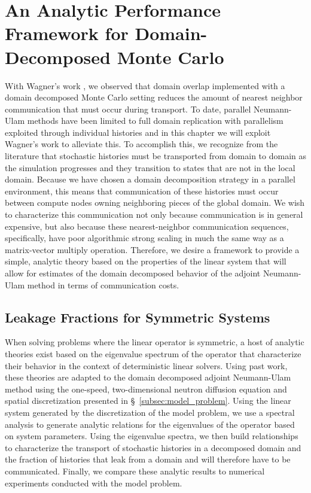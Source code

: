 \section{An Analytic Performance Framework for Domain-Decomposed Monte Carlo}
\label{sec:analytic_framework}
With Wagner's work \citep{wagner_hybrid_2010}, we observed that domain
overlap implemented with a domain decomposed Monte Carlo setting
reduces the amount of nearest neighbor communication that must occur
during transport. To date, parallel Neumann-Ulam methods have been
limited to full domain replication with parallelism exploited through
individual histories \citep{alexandrov_efficient_1998} and in this
chapter we will exploit Wagner's work to alleviate this. To accomplish
this, we recognize from the literature that stochastic histories must
be transported from domain to domain as the simulation progresses and
they transition to states that are not in the local domain. Because we
have chosen a domain decomposition strategy in a parallel environment,
this means that communication of these histories must occur between
compute nodes owning neighboring pieces of the global domain. We wish
to characterize this communication not only because communication is
in general expensive, but also because these nearest-neighbor
communication sequences, specifically, have poor algorithmic strong
scaling \citep{gropp_high-performance_2001} in much the same way as a
matrix-vector multiply operation. Therefore, we desire a framework to
provide a simple, analytic theory based on the properties of the
linear system that will allow for estimates of the domain decomposed
behavior of the adjoint Neumann-Ulam method in terms of communication
costs.

\subsection{Leakage Fractions for Symmetric Systems}
\label{sec:symmetric_leakage_fractions}
When solving problems where the linear operator is symmetric, a host
of analytic theories exist based on the eigenvalue spectrum of the
operator that characterize their behavior in the context of
deterministic linear solvers. Using past work, these theories are
adapted to the domain decomposed adjoint Neumann-Ulam method using the
one-speed, two-dimensional neutron diffusion equation and spatial
discretization presented in \S~\ref{subsec:model_problem}. Using the
linear system generated by the discretization of the model problem, we
use a spectral analysis to generate analytic relations for the
eigenvalues of the operator based on system parameters. Using the
eigenvalue spectra, we then build relationships to characterize the
transport of stochastic histories in a decomposed domain and the
fraction of histories that leak from a domain and will therefore have
to be communicated. Finally, we compare these analytic results to
numerical experiments conducted with the model problem.

